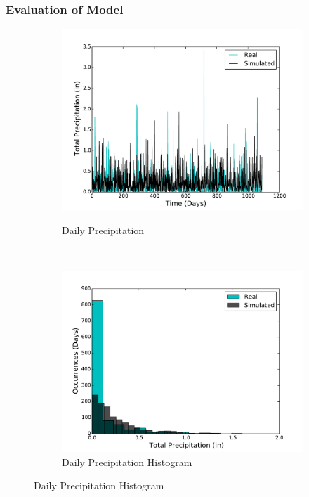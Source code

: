 \documentclass[11pt, letterpaper]{article}
\begin{document}
\subsubsection{Evaluation of Model}

\begin{figure}[H]
  \centering
  \begin{subfigure}[b]{0.45\textwidth}
    \includegraphics[width=\textwidth]{figures/daily_precip.pdf}
    \label{fig:analysis-raw}
    \caption{Daily Precipitation}
  \end{subfigure}
  ~
  \begin{subfigure}[b]{0.45\textwidth}
    \includegraphics[width=\textwidth]{figures/daily_precip_hist.pdf}
    \caption{Daily Precipitation Histogram}

\end{subfigure}
\end{figure}
\end{document}
